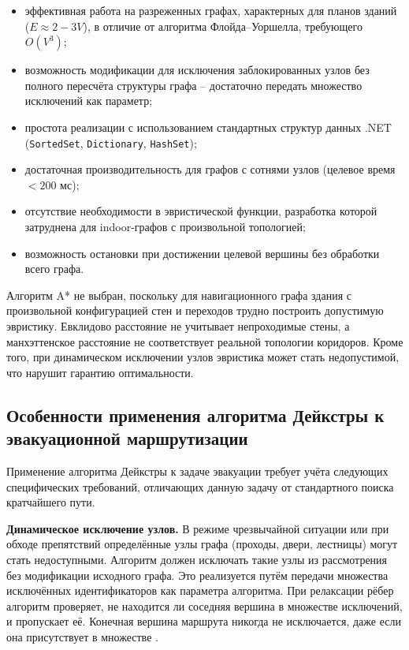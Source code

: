 \begin{itemize}
\item эффективная работа на разреженных графах, характерных для планов зданий ($E \approx 2-3V$), в отличие от алгоритма Флойда--Уоршелла, требующего $O(V^3)$;
\item возможность модификации для исключения заблокированных узлов без полного пересчёта структуры графа -- достаточно передать множество исключений как параметр;
\item простота реализации с использованием стандартных структур данных .NET (\texttt{SortedSet}, \texttt{Dictionary}, \texttt{HashSet});
\item достаточная производительность для графов с сотнями узлов (целевое время $<200$ мс);
\item отсутствие необходимости в эвристической функции, разработка которой затруднена для indoor-графов с произвольной топологией;
\item возможность остановки при достижении целевой вершины без обработки всего графа.
\end{itemize}

Алгоритм A* не выбран, поскольку для навигационного графа здания с произвольной конфигурацией стен и переходов трудно построить допустимую эвристику. Евклидово расстояние не учитывает непроходимые стены, а манхэттенское расстояние не соответствует реальной топологии коридоров. Кроме того, при динамическом исключении узлов эвристика может стать недопустимой, что нарушит гарантию оптимальности.

\subsection{Особенности применения алгоритма Дейкстры к эвакуационной маршрутизации}

Применение алгоритма Дейкстры к задаче эвакуации требует учёта следующих специфических требований, отличающих данную задачу от стандартного поиска кратчайшего пути.

\textbf{Динамическое исключение узлов.} В режиме чрезвычайной ситуации или при обходе препятствий определённые узлы графа (проходы, двери, лестницы) могут стать недоступными. Алгоритм должен исключать такие узлы из рассмотрения без модификации исходного графа. Это реализуется путём передачи множества исключённых идентификаторов как параметра алгоритма. При релаксации рёбер алгоритм проверяет, не находится ли соседняя вершина в множестве исключений, и пропускает её. Конечная вершина маршрута никогда не исключается, даже если она присутствует в множестве \cite{mirahadi2020,zhangfire2019}.

